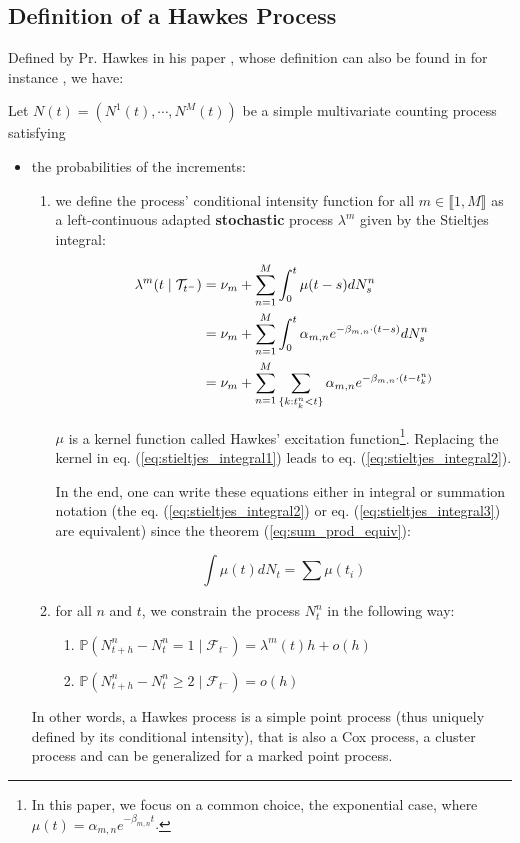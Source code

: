 \subsection{Definition of a Hawkes Process}
Defined by Pr. Hawkes in his paper \cite{Hawkes}, whose definition can also be found in for instance \cite{Chen}, we have:
\begin{definition}
Let $N(t) = \left ( N^1(t), \cdots , N^M(t) \right )$ be a simple multivariate counting process satisfying 

\begin{itemize}
\setlength{\itemindent}{2 cm}
\item the probabilities of the increments:
\begin{enumerate}
\setlength{\itemindent}{3 cm}
\item we define the process' conditional intensity function for all $m \in \llbracket 1, M \rrbracket$ as a left-continuous adapted \textbf{stochastic} process  $\lambda^m$ given by the Stieltjes integral:

\begin{align}
\lambda^m (t \mid \mathcal{T}_{t^-} ) &= 
\nu_m + \sum_{n = 1}^M \int_0^t \mu( t - s ) d N^n_s  \label{eq:stieltjes_integral1} \\
&= \nu_m + \sum_{n = 1}^M \int_0^t \alpha_{m,n} e^{- \beta_{m,n} \cdot ( t - s ) } d N^n_s  \label{eq:stieltjes_integral2} \\
&= \nu_m + \sum_{n = 1}^M \sum_{ \{k: t_k^n < t \}} \alpha_{m,n} e^{- \beta_{m,n} \cdot ( t - t_k^n ) } \label{eq:stieltjes_integral3}
\end{align}

$ \mu $ is a kernel function called Hawkes' excitation function\footnote{In this paper, we focus on a common choice, the exponential case, where $\mu(t) = \alpha_{m,n} e^{- \beta_{m,n}  t  }$.}. Replacing the kernel in eq. (\ref{eq:stieltjes_integral1}) leads to eq. (\ref{eq:stieltjes_integral2}).


In the end, one can write these equations either in integral or summation notation (the eq. (\ref{eq:stieltjes_integral2}) or eq. (\ref{eq:stieltjes_integral3}) are equivalent) since the theorem (\ref{eq:sum_prod_equiv}):

$$ \int \mu(t) dN_t = \sum \mu(t_i) $$
 

\item  for all $n$ and $t$, we constrain the process $N^n_t$ in the following way:

\begin{enumerate}
\setlength{\itemindent}{4 cm}
\item $\mathbb P( N^n_{t+h} - N^n_{t} = 1 \mid \mathcal F_{t^-} ) = \lambda^m (t) h + o(h)$
\item $\mathbb P( N^n_{t+h} - N^n_{t} \geq 2 \mid \mathcal F_{t^-} ) =  o(h)$
\end{enumerate}
\end{enumerate}
In other words, a Hawkes process is a simple point process (thus uniquely defined by its conditional intensity), that is also a Cox process, a cluster process and can be generalized for a marked point process. 



\end{itemize}
\end{definition}
